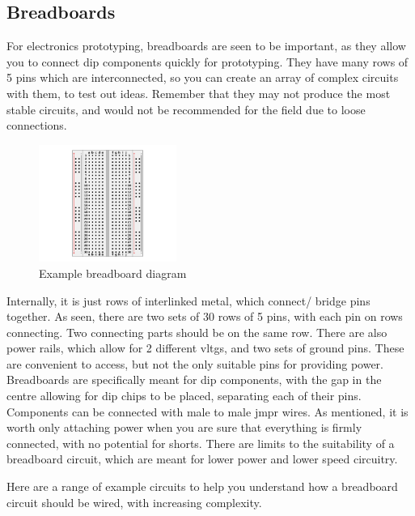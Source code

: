 \documentclass[a4paper,11pt]{report}
\newcommand{\Examples}[1] %
{
\par\noindent %
\phantomsection %
\todo[inline, color=red!30]{\textbf{#1}} %
\vspace{1em} %
}
\begin{document}
\vspace*{1\baselineskip}

\subsection{Breadboards}

For electronics prototyping, breadboards are seen to be important, as they allow you to connect \gls{dip} components quickly for prototyping. They have many rows of 5 pins which are interconnected, so you can create an array of complex circuits with them, to test out ideas. Remember that they may not produce the most stable circuits, and would not be recommended for the field due to loose connections.

\begin{figure}[H]
\centering
\includegraphics[width=0.4\textwidth]{breadboard}
\caption{Example breadboard diagram}
\end{figure}

Internally, it is just rows of interlinked metal, which connect/ bridge pins together. As seen, there are two sets of 30 rows of 5 pins, with each pin on rows connecting. Two connecting parts should be on the same row. There are also power rails, which allow for 2 different \gls{vltg}s, and two sets of ground pins. These are convenient to access, but not the only suitable pins for providing power. Breadboards are specifically meant for \gls{dip} components, with the gap in the centre allowing for \gls{dip} chips to be placed, separating each of their pins. Components can be connected with male to male \gls{jmpr} wires. As mentioned, it is worth only attaching power when you are sure that everything is firmly connected, with no potential for shorts. There are limits to the suitability of a breadboard circuit, which are meant for lower power and lower speed circuitry.

\Examples{Examples}

Here are a range of example circuits to help you understand how a breadboard circuit should be wired, with increasing complexity.
\end{document}

